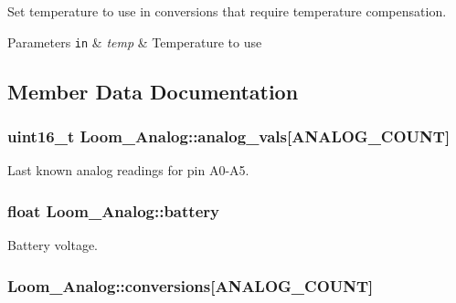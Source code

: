 Set temperature to use in conversions that require temperature compensation. 


\begin{DoxyParams}[1]{Parameters}
\mbox{\tt in}  & {\em temp} & Temperature to use \\
\hline
\end{DoxyParams}


\subsection{Member Data Documentation}
\subsubsection[{\texorpdfstring{analog\+\_\+vals}{analog_vals}}]{\setlength{\rightskip}{0pt plus 5cm}uint16\+\_\+t Loom\+\_\+\+Analog\+::analog\+\_\+vals\mbox{[}{\bf A\+N\+A\+L\+O\+G\+\_\+\+C\+O\+U\+NT}\mbox{]}\hspace{0.3cm}{\ttfamily [protected]}}\hypertarget{class_loom___analog_a9badecf02377889b100678c8c50ba387}{}\label{class_loom___analog_a9badecf02377889b100678c8c50ba387}


Last known analog readings for pin A0-\/\+A5. 

\subsubsection[{\texorpdfstring{battery}{battery}}]{\setlength{\rightskip}{0pt plus 5cm}float Loom\+\_\+\+Analog\+::battery\hspace{0.3cm}{\ttfamily [protected]}}\hypertarget{class_loom___analog_a1a1f859c11385e20ff2328f7df868436}{}\label{class_loom___analog_a1a1f859c11385e20ff2328f7df868436}


Battery voltage. 

\subsubsection[{\texorpdfstring{conversions}{conversions}}]{ Loom\+\_\+\+Analog\+::conversions\mbox{[}{\bf A\+N\+A\+L\+O\+G\+\_\+\+C\+O\+U\+NT}\mbox{]}\hspace{0.3cm}{\ttfamily [protected]}}\hypertarget{class_loom___analog_a3bf07770f1244670cbfaa8d6e563f2ef}{}\label{class_loom___analog_a3bf07770f1244670cbfaa8d6e563f2ef}


